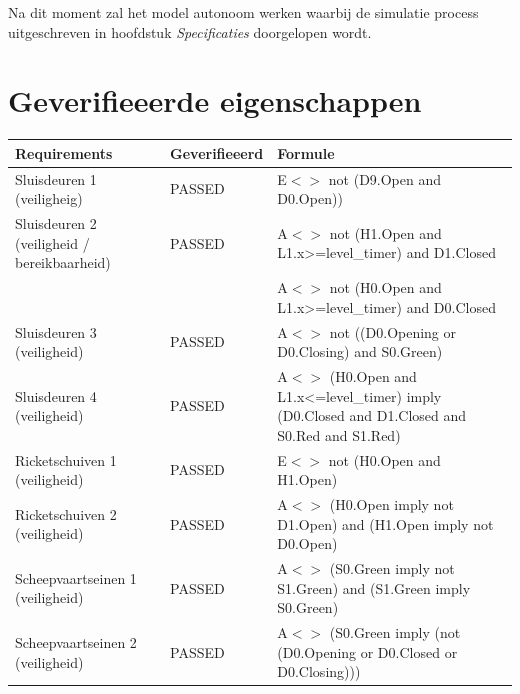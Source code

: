 \documentclass{article}
\begin{document}
\noindent Na dit moment zal het model autonoom werken waarbij de simulatie process uitgeschreven
in hoofdstuk \textit{Specificaties} doorgelopen wordt.


\newpage
\section {Geverifieeerde eigenschappen}
    \centering
    \begin{tabular}{ |p{4cm}||p{2cm}|p{7cm}|}
        \hline
            Requirements & Geverifieeerd & Formule \\
        \hline
        \hline
            Sluisdeuren 1 (veiligheig)                      &           \leavevmode\color[HTML]{32CD32} PASSED          &         E$<>$ not (D9.Open and D0.Open))        \\ \hline
            Sluisdeuren 2 (veiligheid / bereikbaarheid)     &           \leavevmode\color[HTML]{32CD32} PASSED          &         A$<>$ not (H1.Open and L1.x>=level\_timer) and D1.Closed \\ 
            &&A$<>$ not (H0.Open and L1.x>=level\_timer) and D0.Closed       \\ \hline
            Sluisdeuren 3 (veiligheid)                      &           \leavevmode\color[HTML]{32CD32} PASSED          &         A$<>$ not ((D0.Opening or D0.Closing) and S0.Green)        \\ \hline
            Sluisdeuren 4 (veiligheid)                      &           \leavevmode\color[HTML]{32CD32} PASSED          &         A$<>$ (H0.Open and L1.x<=level\_timer) imply (D0.Closed and D1.Closed and S0.Red and S1.Red)        \\ \hline
            Ricketschuiven 1 (veiligheid)                   &           \leavevmode\color[HTML]{32CD32} PASSED          &         E$<>$ not (H0.Open and H1.Open)        \\ \hline
            Ricketschuiven 2 (veiligheid)                   &           \leavevmode\color[HTML]{32CD32} PASSED          &         A$<>$ (H0.Open imply not D1.Open) and (H1.Open imply not D0.Open)        \\ \hline
            Scheepvaartseinen 1 (veiligheid)                &           \leavevmode\color[HTML]{32CD32} PASSED          &         A$<>$ (S0.Green imply not S1.Green) and (S1.Green imply S0.Green)        \\ \hline
            Scheepvaartseinen 2 (veiligheid)                &           \leavevmode\color[HTML]{32CD32} PASSED          &         A$<>$ (S0.Green imply (not (D0.Opening or D0.Closed or D0.Closing)))        \\ \hline

\end{tabular}
\end{document}
